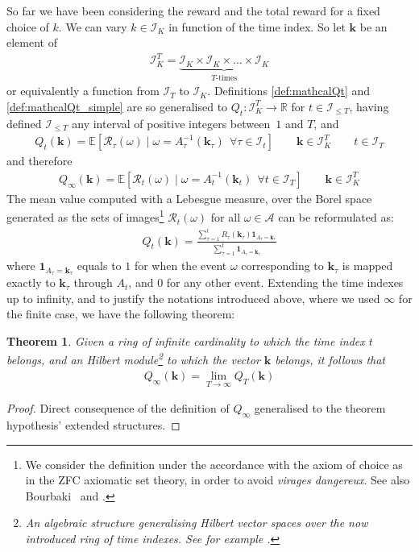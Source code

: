 \documentclass[]{scrartcl}
\newtheorem{theorem}{Theorem}[section]
\theoremstyle{definition}
\begin{document}
So far we have been considering the reward and the total reward for a fixed choice of $k$. We can vary $k\in \mathcal{I}_K$ in function of the time index. So let $\mathbf{k}$ be an element of
\begin{align*}
\mathcal{I}_K^T = \underbrace{\mathcal{I}_K\times \mathcal{I}_K \times \dots \times \mathcal{I}_K}_{T\text{-times}}
\end{align*}
or equivalently a function from $\mathcal{I}_T$ to $\mathcal{I}_K$.
Definitions \ref{def:mathcalQt} and \ref{def:mathcalQt_simple} are so generalised to $Q_t:\mathcal{I}_K^T \rightarrow \mathbb{R}$ for $t\in\mathcal{I}_{\leq T}$, having defined $\mathcal{I}_{\leq T}$ any interval of positive integers between~$1$ and $T$, and
\begin{align*}
Q_t(\mathbf{k}) = \mathbb{E} \left[ \mathcal{R}_{\tau}(\omega)
\mid
\omega = A^{-1}_{\tau}(\mathbf{k}_{\tau})~~ \forall \tau \in \mathcal{I}_t \right]
\qquad
\mathbf{k} \in \mathcal{I}_K^T
\qquad
t \in \mathcal{I}_T
\end{align*}
and therefore
\begin{align*}
Q_{\infty}(\mathbf{k}) = \mathbb{E} \left[ \mathcal{R}_{t}(\omega)
\mid
\omega = A^{-1}_{t}(\mathbf{k}_{t})~~ \forall t \in \mathcal{I}_T \right]
\qquad
\mathbf{k} \in \mathcal{I}_K^T
\end{align*}
The mean value computed with a Lebesgue measure, over the Borel space generated as the sets of images\footnote{
    We consider the definition under the accordance with the axiom of choice as in the ZFC axiomatic set theory, in order to avoid \emph{virages dangereux}. See also Bourbaki~\cite{bourbaki2004theory} and \cite{takeuti1982classes}.
} $\mathcal{R}_t(\omega)$ for all $\omega \in \mathcal{A}$ can be reformulated as:
\begin{align*}
Q_t(\mathbf{k})
=
\frac
{\sum_{\tau=1}^{t} R_{\tau}(\mathbf{k}_{\tau}) \mathbf{1}_{A_\tau = \mathbf{k}_{\tau}}}
{\sum_{\tau=1}^{t} \mathbf{1}_{A_\tau = \mathbf{k}_{\tau}}}
\end{align*}
where $\mathbf{1}_{A_\tau = \mathbf{k}_{\tau}}$ equals to $1$ for when the event $\omega$ corresponding to $\mathbf{k}_{\tau}$ is mapped exactly to $\mathbf{k}_{\tau}$ through $A_t$, and $0$ for any other event.
Extending the time indexes up to infinity, and to justify the notations introduced above, where we used $\infty$ for the finite case, we have the following theorem:
\begin{theorem}\label{th:bourbaki}
Given a ring of infinite cardinality to which the time index $t$ belongs, and an Hilbert module\footnote{An algebraic structure generalising Hilbert vector spaces over the now introduced ring of time indexes. See for example \cite{bourbaki1987topological}.} to which the vector $\mathbf{k}$ belongs, it follows that
\begin{align*}
Q_{\infty}(\mathbf{k}) = \lim_{T \rightarrow \infty} Q_{T}(\mathbf{k})
\end{align*}
\end{theorem}
\begin{proof}
    Direct consequence of the definition of $Q_{\infty}$ generalised to the theorem hypothesis' extended structures.
\end{proof}
\end{document}
